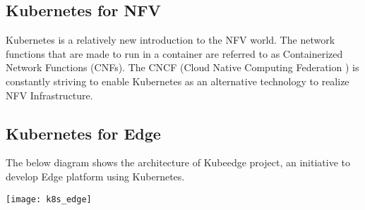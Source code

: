 \documentclass[../seminar.tex]{subfiles}
\begin{document}
\subsection{Kubernetes for NFV}
	
\begin{flushleft}
Kubernetes is a relatively new introduction to the NFV world. The network functions that are made to run in a container are referred to as Containerized Network Functions (CNFs). The CNCF (Cloud Native Computing Federation ) is constantly striving to enable Kubernetes as an alternative technology to realize NFV Infrastructure.
\end{flushleft}

\subsection{Kubernetes for Edge}

\begin{flushleft}
The below diagram shows the architecture of Kubeedge project, an initiative to develop Edge platform using Kubernetes.

\texttt{[image: k8s\_edge]}
	
\end{flushleft}
\end{document}
